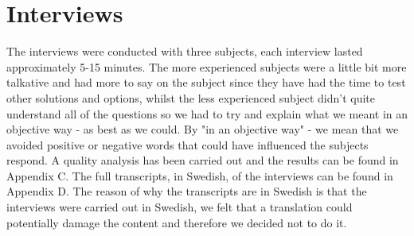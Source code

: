 \documentclass[a4paper,oneside]{bth} %
\begin{document}
				
				
				
			\section{Interviews}
			The interviews were conducted with three subjects, each interview lasted approximately 5-15 minutes. 
			The more experienced subjects were a little bit more talkative and had more to say on the subject since they have had the time to test other solutions and options, whilst the less experienced subject didn't quite understand all of the questions so we had to try and explain what we meant in an objective way - as best as we could.
			By "in an objective way" - we mean that we avoided positive or negative words that could have influenced the subjects respond.
			A quality analysis has been carried out and the results can be found in Appendix C.
			The full transcripts, in Swedish, of the interviews can be found in Appendix D. The reason of why the transcripts are in Swedish is that the interviews were carried out in Swedish, we felt that a translation could potentially damage the content and therefore we decided not to do it.\\
			
\end{document}
